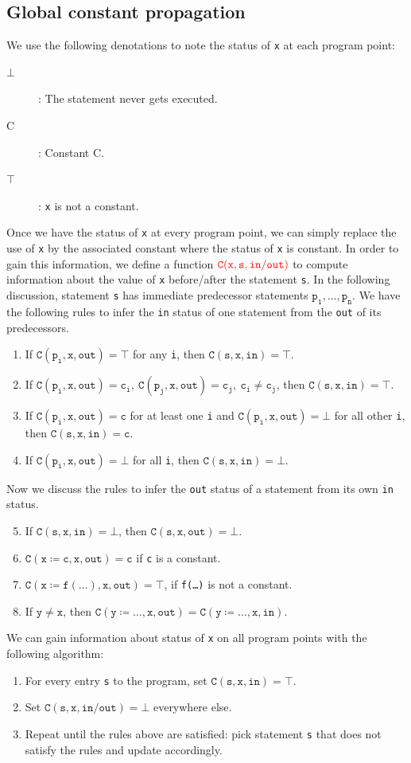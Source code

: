 \subsection{Global constant propagation}
We use the following denotations to note the status of \texttt{x} at each program point:
\begin{description}
\item[$\bot$]: The statement never gets executed.
\item[C]: Constant C.
\item[$\top$]: \texttt{x} is not a constant.
\end{description}
Once we have the status of \texttt{x} at every program point, we can simply replace the use of \texttt{x} by the associated constant where the status of \texttt{x} is constant. In order to gain this information, we define a function $\mathtt{\color{red}C(x,s,in/out)}$ to compute information about the value of \texttt{x} before/after the statement \texttt{s}. In the following discussion, statement \texttt{s} has immediate predecessor statements $\mathtt{p_1,\dots,p_n}$. We have the following rules to infer the \texttt{in} status of one statement from the \texttt{out} of its predecessors.
\begin{enumerate}
\item If $\mathtt{C(p_i,x,out) = \top}$ for any \texttt{i}, then $\mathtt{C(s,x,in) = \top}$.
\item If $\mathtt{C(p_i,x,out) = c_i,\:C(p_j,x,out) = c_j,\:c_i\neq c_j}$, then $\mathtt{C(s,x,in) = \top}$.
\item If $\mathtt{C(p_i,x,out) = c}$ for at least one \texttt{i} and $\mathtt{C(p_i,x,out) = \bot}$ for all other \texttt{i}, then $\mathtt{C(s,x,in) = c}$.
\item If $\mathtt{C(p_i,x,out) = \bot}$ for all \texttt{i}, then $\mathtt{C(s,x,in) = \bot}$.  
\end{enumerate} 
Now we discuss the rules to infer the \texttt{out} status of a statement from its own \texttt{in} status.
\begin{enumerate}
\setcounter{enumi}{4}
\item If $\mathtt{C(s,x,in)=\bot}$, then $\mathtt{C(s,x,out)=\bot}$.
\item $\mathtt{C(x\coloneqq c,x,out)=c}$ if \texttt{c} is a constant.
\item $\mathtt{C(x\coloneqq f(\dots),x,out)=\top}$, if \texttt{f(\dots)} is not a constant.
\item If $\mathtt{y\neq x}$, then $\mathtt{C(y\coloneqq \dots,x,out)=C(y\coloneqq \dots,x,in)}$.
\end{enumerate}
We can gain information about status of \texttt{x} on all program points with the following algorithm:
\begin{enumerate}
\item For every entry \texttt{s} to the program, set $\mathtt{C(s,x,in)=\top}$.
\item Set $\mathtt{C(s,x,in/out)=\bot}$ everywhere else.
\item Repeat until the rules above are satisfied: pick statement \texttt{s} that does not satisfy the rules and update accordingly. 
\end{enumerate}

